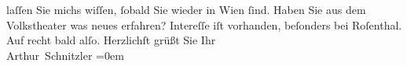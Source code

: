 \begin{ledgroupsized}[t]{13cm}
               laſſen Sie michs wiſſen, ſobald Sie {\pb}wieder in Wien ſind. Haben Sie aus dem Volkstheater was neues erfahren? Intereſſe iſt vorhanden,
               beſonders bei Roſenthal. Auf recht bald
               alſo.\pend
           \pstart
           Herzlichſt grüßt Sie Ihr{\\[\baselineskip]}\spacefill\mbox{Arthur Schnitzler}\pend
           \leftskip=0em{}
         
         \endnumbering{}\end{ledgroupsized}  \newcommand{\dateiname}{L02324}\newcommand{\titel}{Arthur Schnitzler an Robert Adam, 5. 8. 1919}\newcommand{\editorInnen}{Martin Anton Müller und Gerd-Hermann Susen}
      